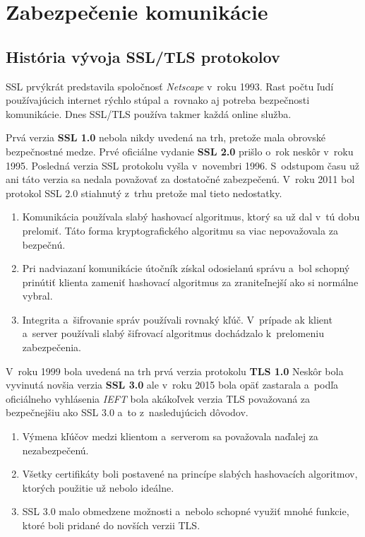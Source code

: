 \chapter[Zabezpečenie komunikácie]{Zabezpečenie komunikácie}

\section{História vývoja SSL/TLS protokolov}
SSL prvýkrát predstavila spoločnosť \emph{Netscape} v~roku 1993. Rast počtu ľudí používajúcich internet rýchlo stúpal a~rovnako aj potreba bezpečnosti komunikácie. Dnes SSL/TLS používa takmer každá online služba. 

Prvá verzia \textbf{SSL 1.0} nebola nikdy uvedená na trh, pretože mala obrovské bezpečnostné medze. Prvé oficiálne vydanie \textbf{SSL 2.0} prišlo o~rok neskôr v~roku 1995. Posledná verzia SSL protokolu vyšla v~novembri 1996. S~odstupom času už ani táto verzia sa nedala považovať za dostatočné zabezpečenú. V~roku 2011 bol protokol SSL 2.0 stiahnutý z~trhu pretože mal tieto nedostatky.
\begin{enumerate}

\item Komunikácia používala slabý hashovací algoritmus, ktorý sa už dal v~tú dobu prelomiť. Táto forma kryptografického algoritmu sa viac nepovažovala za bezpečnú.

\item Pri nadviazaní komunikácie útočník získal odosielanú správu a~bol schopný prinútiť klienta zameniť hashovací algoritmus za zraniteľnejší ako si normálne vybral.

\item Integrita a~šifrovanie správ používali rovnaký kľúč. V~prípade ak klient a~server používali slabý šifrovací algoritmus dochádzalo k~prelomeniu zabezpečenia.

\end{enumerate}

V~roku 1999 bola uvedená na trh prvá verzia protokolu \textbf{TLS 1.0}
Neskôr bola vyvinutá novšia verzia \textbf{SSL 3.0} ale v~roku 2015 bola opäť zastarala a~podľa oficiálneho vyhlásenia \emph{IEFT} bola akákoľvek verzia TLS považovaná za bezpečnejšiu ako SSL 3.0 a~to z~nasledujúcich dôvodov.

\begin{enumerate}

\item Výmena kľúčov medzi klientom a~serverom sa považovala naďalej za nezabezpečenú.

\item Všetky certifikáty boli postavené na princípe slabých hashovacích algoritmov, ktorých použitie už nebolo ideálne.

\item SSL 3.0 malo obmedzene možnosti a~nebolo schopné využiť mnohé funkcie, ktoré boli pridané do novších verzii TLS.

\end{enumerate}

